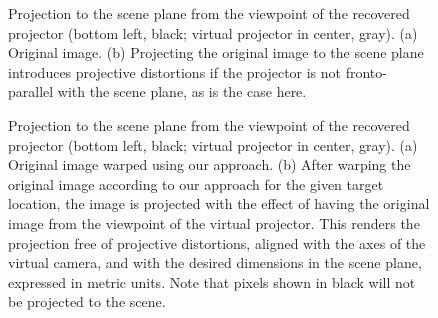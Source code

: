 \documentclass[review]{elsarticle}
\begin{document}
\begin{figure}
    \centering
    \qquad
    \caption{Projection to the scene plane from the viewpoint of the recovered projector (bottom left, black; virtual projector in center, gray). (a) Original image. (b) Projecting the original image to the scene plane introduces projective distortions if the projector is not fronto-parallel with the scene plane, as is the case here.}
    \label{fig:proj}
\end{figure}

\begin{figure}
    \centering
    \qquad
    \caption{Projection to the scene plane from the viewpoint of the recovered projector (bottom left, black; virtual projector in center, gray). (a) Original image warped using our approach. (b) After warping the original image according to our approach for the given target location, the image is projected with the effect of having the original image from the viewpoint of the virtual projector. This renders the projection free of projective distortions, aligned with the axes of the virtual camera, and with the desired dimensions in the scene plane, expressed in metric units. Note that pixels shown in black will not be projected to the scene.}
    \label{fig:warp}
\end{figure}
\end{document}
